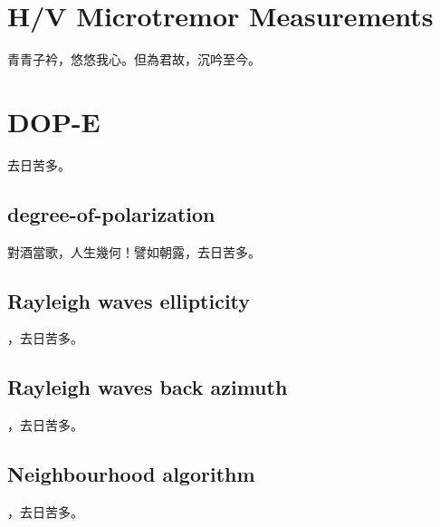 \section{H/V Microtremor Measurements}
青青子衿，悠悠我心。但為君故，沉吟至今。

\section{DOP-E}
去日苦多。

\subsection{degree-of-polarization}
對酒當歌，人生幾何！譬如朝露，去日苦多。
\subsection{Rayleigh waves ellipticity}
，去日苦多。
\subsection{Rayleigh waves back azimuth}
，去日苦多。
\subsection{Neighbourhood algorithm}
，去日苦多。